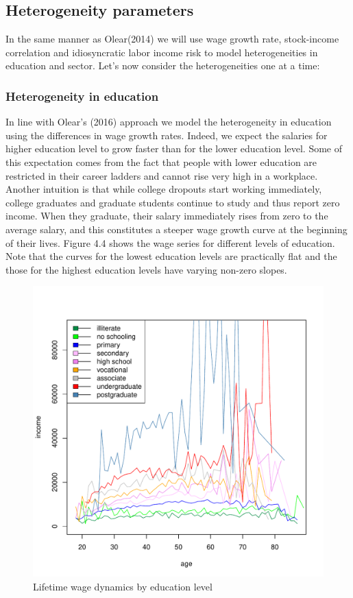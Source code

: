 \subsection{Heterogeneity parameters}
In the same manner as Olear(2014) we will use wage growth rate, stock-income correlation and idiosyncratic labor income risk to model heterogeneities in education and sector. Let's now consider the heterogeneities one at a time:

\subsubsection{Heterogeneity in education}
In line with Olear's (2016) approach we model the heterogeneity in education using the differences in wage growth rates. Indeed, we expect the salaries for higher education level to grow faster than for the lower education level. Some of this expectation comes from the fact that people with lower education are restricted in their career ladders and cannot rise very high in a workplace. Another intuition is that while college dropouts start working immediately, college graduates and graduate students continue to study and thus report zero income. When they graduate, their salary immediately rises from zero to the average salary, and this constitutes a steeper wage growth curve at the beginning of their lives. Figure 4.4 shows the wage series for different levels of education. Note that the curves for the lowest education levels are practically flat and the those for the highest education levels have varying non-zero slopes. 

\begin{figure}[h]
	\centering
	\includegraphics[scale=0.6]{figs/wage2educ.pdf}
	\caption{Lifetime wage dynamics by education level}
\end{figure}

